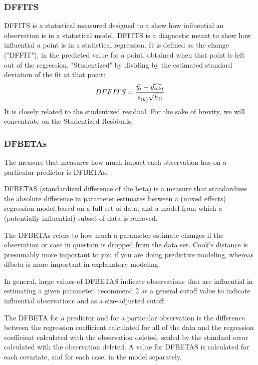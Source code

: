 \documentclass[12pt, a4paper]{report}
\theoremstyle{plain}
\theoremstyle{definition}
\theoremstyle{remark}
\begin{document}
\subsubsection{DFFITS} %
	DFFITS is a statistical measured designed to a show how influential an observation is in a statistical model. DFFITS is a diagnostic meant to show how influential a point is in a statistical regression. It is defined as the change ("DFFIT"), in the predicted value for a point, obtained when that point is left out of the regression, "Studentized" by dividing by the estimated standard deviation of the fit at that point:
	\begin{displaymath} DFFITS = {\widehat{y_i} -
		\widehat{y_{i(k)}} \over s_{(k)} \sqrt{h_{ii}}} \end{displaymath}
	It is closely related to the studentized residual. For the sake of brevity, we will concentrate on the Studentized Residuals.
	
	\subsubsection{DFBETAs}
	The measure that measures how much impact each observation has on a particular predictor is DFBETAs.
	
	
	DFBETAS (standardized difference of the beta) is a measure that standardizes the absolute difference in parameter estimates between a (mixed effects) regression model based on a full set of data, and a model from which a (potentially influential) subset of data is removed.
	
	
	The DFBETAs refers to how much a parameter estimate changes if the observation or case in question is dropped from the data set.
	Cook's distance is presumably more important to you if you are doing predictive modeling, whereas dfbeta is more important in explanatory modeling.
	
	In general, large values of DFBETAS indicate observations that are influential in estimating a given parameter. \citet{belsley2005} recommend 2 as a general cutoff value to indicate influential observations and  as a size-adjusted cutoff.
	
	
	The DFBETA for a predictor and for a particular observation is the difference between the regression coefficient calculated for all of the data and the regression coefficient calculated with the observation deleted, scaled by the standard error calculated with the observation deleted.
	A value for DFBETAS is calculated for each covariate, and for each case, in the model separately.
	
\end{document}
